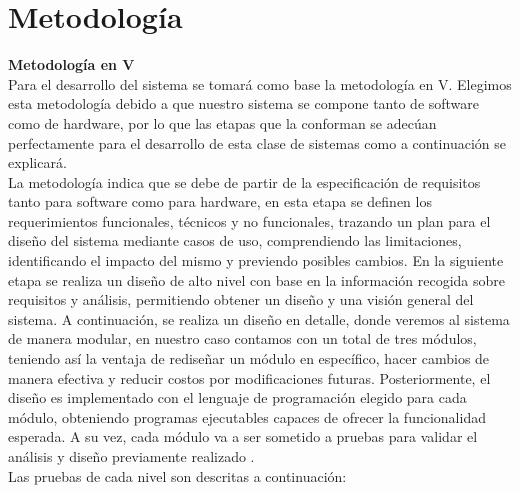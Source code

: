 \section{Metodología}

\textbf{Metodología en V}\\
Para el desarrollo del sistema se tomará como base la metodología en V. 
Elegimos esta metodología debido a que nuestro sistema se compone tanto de software como de hardware, por lo que las etapas que la conforman se adecúan perfectamente para el desarrollo de esta clase de sistemas como a continuación se explicará. \\
La metodología indica que se debe de partir de la especificación de requisitos tanto para software como para hardware, en esta etapa se definen los requerimientos funcionales, técnicos y no funcionales, trazando un plan para el diseño del sistema mediante casos de uso, comprendiendo las limitaciones, identificando el impacto del mismo y previendo posibles cambios. En la siguiente etapa se realiza un diseño de alto nivel con base en la información recogida sobre requisitos y análisis, permitiendo obtener un diseño y una visión general del sistema. 
A continuación, se realiza un diseño en detalle, donde veremos al sistema de manera modular, en nuestro caso contamos con un total de tres módulos, teniendo así la ventaja de rediseñar un módulo en específico, hacer cambios de manera efectiva y reducir costos por modificaciones futuras. Posteriormente, el diseño es implementado con el lenguaje de programación elegido para cada módulo, obteniendo programas ejecutables capaces de ofrecer la funcionalidad esperada. A su vez, cada módulo va a ser sometido a pruebas para validar el análisis y diseño previamente realizado \citep{Metodologia1}.
\\
Las pruebas de cada nivel son descritas a continuación:

